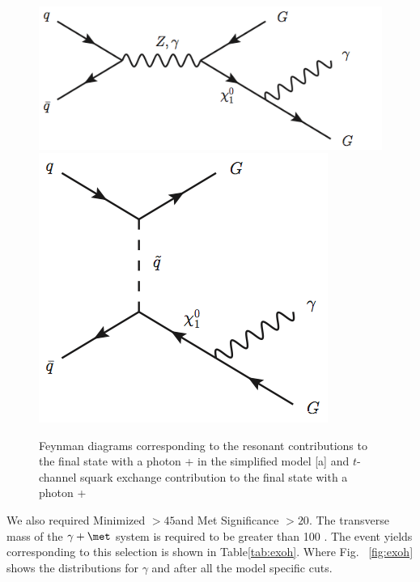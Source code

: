 \begin{figure}[!hp]
\centering
{\label{fig:lowerbound}\includegraphics[scale=0.35]{analysis_figs/lower.png}}
{\label{fig:upperbound}\includegraphics[scale=0.3]{analysis_figs/upper.png}}
\caption{Feynman diagrams corresponding to the resonant contributions to the final state with a photon + \met in the simplified model [a] and $t$-channel squark exchange contribution to the final state with a photon + \met [b]}
\end{figure}

We also required Minimized \met $> 45 $\GeV and Met Significance $> 20$. The transverse mass of the $\gamma + \met$ system is required to be greater than 100 \GeV. The event yields corresponding to this selection is shown in Table\ref{tab:exoh}. Where Fig. ~\ref{fig:exoh} shows the distributions for $\gamma$ \pt and \met after all the model specific cuts.

